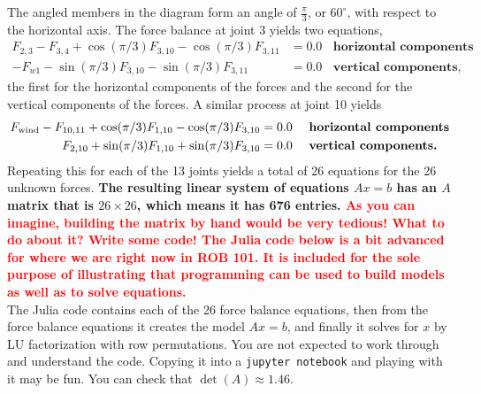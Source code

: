 The angled members in the diagram form an angle of $\frac{\pi}{3}$, or $60^\circ$, with respect to the horizontal axis. The force balance at joint 3 yields two equations,
\begin{equation}
    \begin{aligned}
    F_{2,3}-F_{3,4}+\cos(\pi/3) F_{3,10}-\cos(\pi/3) F_{3,11} &=0.0~~~~ \textbf{horizontal components}\\
  -F_{w1}-\sin(\pi/3) F_{3,10}-\sin(\pi/3) F_{3,11}  & = 0.0~~~~ \textbf{vertical components,}
    \end{aligned}
\end{equation}
the first for the horizontal components of the forces and the second for the vertical components of the forces. A similar process at joint 10 yields
\begin{equation}
    \begin{aligned}
    F_{\rm wind}-F_{10,11}+\cos(\pi/3) F_{1,10}-\cos(\pi/3) F_{3,10} &=0.0~~~~ \textbf{horizontal components}\\
  F_{2,10}+\sin(\pi/3) F_{1,10}+\sin(\pi/3) F_{3,10}  & = 0.0~~~~ \textbf{vertical components.}
    \end{aligned}
\end{equation}
Repeating this for each of the 13 joints yields a total of 26 equations for the 26 unknown forces. \textbf{The resulting linear system of equations $Ax=b$ has an $A$ matrix that is $26 \times 26$, which means it has 676 entries. \textcolor{red}{As you can imagine, building the matrix by hand would be very tedious! What to do about it? Write some code! The Julia code below is a bit advanced for where we are right now in ROB 101. It is included for the sole purpose of illustrating that programming can be used to build models as well as to solve equations.}}\\

The Julia code contains each of the 26 force balance equations, then from the force balance equations it creates the model $Ax=b$, and finally it solves for $x$ by LU factorization with row permutations. You are not expected to work through and understand the code. Copying it into a \texttt{jupyter notebook} and playing with it may be fun. You can check that $\det(A)\approx 1.46$. 

